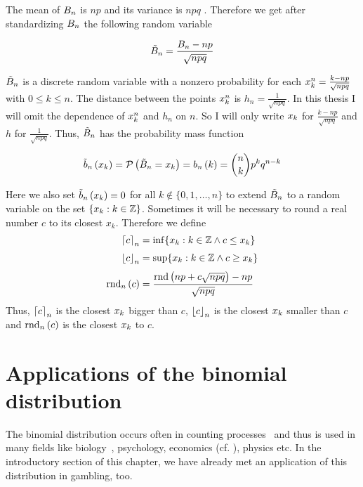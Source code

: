 
The mean of $\Bs[n]$ is $np$ and its variance is $npq$ \cite[p. 112]{georgii}\cite[pp. 8-9]{fels}\cite{wiki:binomial_distribution}. Therefore we get after standardizing $\Bs[n]$ the following random variable

\begin{align}
  \BBs[n] = \frac{\Bs[n]-np}{\sqrt{npq}}
\end{align}

$\BBs$ is a discrete random variable with a nonzero probability for each $\x[k]^n = \frac{k-np}{\sqrt{npq}}$ with $0\le k\le n$. The distance between the points $\x[k]^n$  is $h_n = \frac{1}{\sqrt{npq}}$. In this thesis I will omit the dependence of $\x^n$ and $h_n$ on $n$. So I will only write $\x$ for $\frac{k-np}{\sqrt{npq}}$ and $h$ for $\frac 1{\sqrt{npq}}$. Thus, $\BBs$ has the probability mass function

\begin{align}
  \bb{\x[k]} = \P{\BBs = \x[k]} = \b{k} = \binom nk p^kq^{n-k}
\end{align}

Here we also set $\bb{\x[k]}=0$ for all $k\notin\{0,1,\ldots,n\}$ to extend $\BBs$ to a random variable on the set $\{\x[k] : k\in\Z\}$. Sometimes it will be necessary to round a real number $c$ to its closest $x_k$. Therefore we define
\begin{align}
  \xup{c} &= \inf \{ x_k : k\in\Z \land c \le x_k \} \nl
  \xdown{c} &= \sup \{ x_k : k \in \Z \land c \ge x_k \} \nl
  \xrnd{c} &= \frac{\rnd{np+c\sqrt{npq}}-np}{\sqrt{npq}}
\end{align}
Thus, $\xup{c}$ is the closest $\x$ bigger than $c$, $\xdown{c}$ is the closest $\x$ smaller than $c$ and $\xrnd{c}$ is the closest $\x$ to $c$.

\section{Applications of the binomial distribution}


The binomial distribution occurs often in counting processes~\cite[p. 138]{henze} and thus is used in many fields like biology~\cite[p. 146]{henze}, psychology, economics (cf. \cite[p. 59]{irle}), physics etc. In the introductory section of this chapter, we have already met an application of this distribution in gambling, too.

